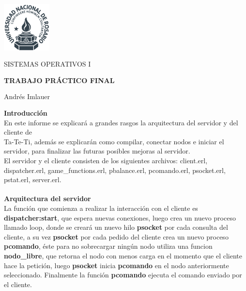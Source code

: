 \documentclass{article}
\begin{document}
\begin{titlepage}
	\centering
	\includegraphics[width=2.5cm]{unr.png}\par\vspace{1cm}
	{\scshape \fontsize{8}{4} \selectfont {FACULTAD DE CIENCIAS EXACTAS, INGENIERÍA Y AGRIMENSURA} \par}
	\vspace{1cm}
	{\scshape\Large SISTEMAS OPERATIVOS I\par}
	\vspace{1.5cm}
	{\huge \bfseries TRABAJO PRÁCTICO FINAL\par}
	\vspace{4cm}
	\large \fontsize{12}{5} \selectfont Andrés Imlauer \par
\end{titlepage}
\noindent
{\Large \textbf{Introducción}} \\
En este informe se explicará a grandes rasgos la arquitectura del servidor y del cliente de \\
Ta-Te-Ti, además se explicarán como compilar, conectar nodos e iniciar el servidor, para
finalizar las futuras posibles mejoras al servidor. \\
El servidor y el cliente consisten de los siguientes archivos: client.erl, dispatcher.erl, game\_functions.erl, pbalance.erl,
pcomando.erl, psocket.erl, pstat.erl, server.erl. \\ \\
{\Large \textbf{Arquitectura del servidor}} \\
La función que comienza a realizar la interacción con el cliente es \textbf{dispatcher:start}, que espera
nuevas conexiones, luego crea un nuevo proceso llamado loop, donde se 
creará un nuevo hilo \textbf{psocket} por cada consulta del cliente, a su vez \textbf{psocket} por cada 
pedido del cliente crea un nuevo proceso \textbf{pcomando}, éste para no sobrecargar ningún 
nodo utiliza una funcion \textbf{nodo\_libre}, que retorna el nodo con menos carga en el 
momento que el cliente hace la petición, luego \textbf{psocket} inicia \textbf{pcomando} en el nodo 
anteriormente seleccionado. Finalmente la función \textbf{pcomando} ejecuta el comando 
enviado por el cliente. \\
\end{document}
